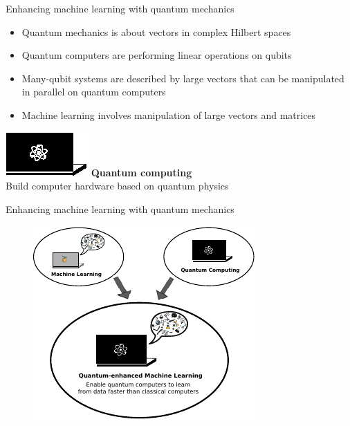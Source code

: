 \documentclass[10pt]{beamer}
\begin{document}
{\begin{frame}[fragile]{Enhancing machine learning with quantum mechanics}
\begin{minipage}[c]{0.59\textwidth}
\begin{itemize}
\item Quantum mechanics is about vectors in complex Hilbert spaces
\item Quantum computers are performing linear operations on qubits
\item Many-qubit systems are described by large vectors that can be manipulated in parallel on quantum computers
\item Machine learning involves manipulation of large vectors and matrices
\end{itemize}
\end{minipage}%
\hspace{0.3cm}
\begin{minipage}[c]{0.39\textwidth}
\vspace{2.8cm}
\centering
\hspace{-1cm}\includegraphics[scale=2.2]{Vectors/laptop_q.eps}
\flushleft
\textbf{Quantum computing}\\
Build computer hardware based on quantum physics
\end{minipage}

\end{frame}
}

{
\begin{frame}[fragile]{Enhancing machine learning with quantum mechanics}

\begin{figure}
\centering
\includegraphics[scale=1.7]{Vectors/laptop_qml_flowchart.pdf}
\end{figure}

\end{frame}
}
\end{document}
